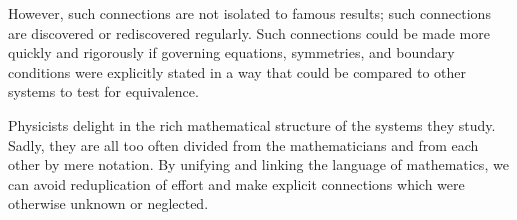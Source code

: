 \documentclass[12pt,letterpaper]{article}
\begin{document}
However,
such connections are not isolated to famous results;
such connections are discovered or rediscovered regularly.
Such connections could be made more quickly and rigorously if governing equations,
symmetries, and boundary conditions were explicitly stated in a way that could be compared to other systems to test for equivalence.

Physicists delight in the rich mathematical structure of the systems they study.
Sadly, they are all too often divided from the mathematicians and from each other by mere notation.
By unifying and linking the language of mathematics,
we can avoid reduplication of effort and make explicit connections which were otherwise unknown or neglected.
\end{document}
